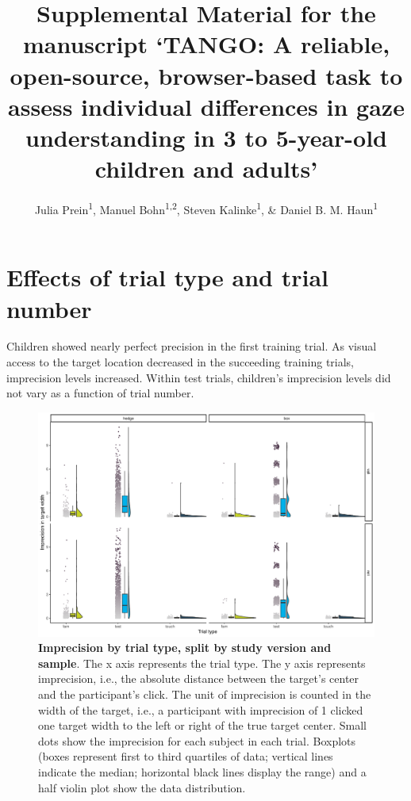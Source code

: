 \documentclass[
  man,floatsintext]{apa6}
\title{Supplemental Material for the manuscript `TANGO: A reliable, open-source, browser-based task to assess individual differences in gaze understanding in 3 to 5-year-old children and adults'}
\author{Julia Prein\textsuperscript{1}, Manuel Bohn\textsuperscript{1,2}, Steven Kalinke\textsuperscript{1}, \& Daniel B. M. Haun\textsuperscript{1}}
\date{}
\affiliation{\vspace{0.5cm}\textsuperscript{1} Department of Comparative Cultural Psychology, Max Planck Institute for Evolutionary Anthropology, Leipzig, Germany\\\textsuperscript{2} Institute of Psychology, Leuphana University Lüneburg, Germany}
\begin{document}
\maketitle

\hypertarget{effects-of-trial-type-and-trial-number}{%
\section{Effects of trial type and trial number}\label{effects-of-trial-type-and-trial-number}}

Children showed nearly perfect precision in the first training trial. As visual access to the target location decreased in the succeeding training trials, imprecision levels increased. Within test trials, children's imprecision levels did not vary as a function of trial number.



\begin{figure}

{\centering \includegraphics[width=1\linewidth]{../figures/tango_supplements_trainingtrials} 

}

\caption{\textbf{Imprecision by trial type, split by study version and sample}. The x axis represents the trial type. The y axis represents imprecision, i.e., the absolute distance between the target's center and the participant's click. The unit of imprecision is counted in the width of the target, i.e., a participant with imprecision of 1 clicked one target width to the left or right of the true target center. Small dots show the imprecision for each subject in each trial. Boxplots (boxes represent first to third quartiles of data; vertical lines indicate the median; horizontal black lines display the range) and a half violin plot show the data distribution.}\label{fig:fig1}
\end{figure}
\end{document}
